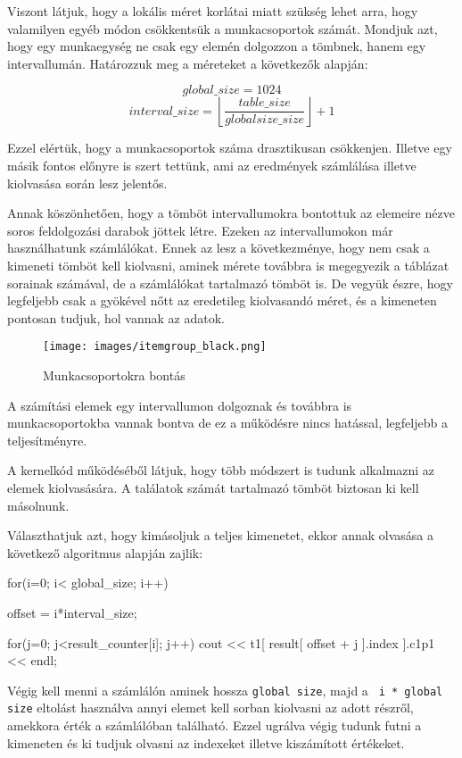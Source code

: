 Viszont látjuk, hogy a lokális méret korlátai miatt szükség lehet arra, hogy valamilyen egyéb módon csökkentsük a munkacsoportok számát.
Mondjuk azt, hogy egy munkaegység ne csak egy elemén dolgozzon a tömbnek, hanem egy intervallumán.
Határozzuk meg a méreteket a következők alapján:

$$ global\_size = 1024 $$
$$interval\_size =  \left\lfloor \frac{table\_size }{globalsize\_size} \right\rfloor  +1  $$

Ezzel elértük, hogy a munkacsoportok száma drasztikusan csökkenjen. Illetve egy másik fontos előnyre is szert tettünk, ami az eredmények számlálása illetve kiolvasása során lesz jelentős.


Annak köszönhetően, hogy a tömböt intervallumokra bontottuk az elemeire nézve soros feldolgozási darabok jöttek létre. Ezeken az intervallumokon már 
használhatunk számlálókat. Ennek az lesz a következménye, hogy nem csak a kimeneti tömböt kell kiolvasni, aminek mérete továbbra is megegyezik a táblázat sorainak számával, de a számlálókat tartalmazó tömböt is.
De vegyük észre, hogy legfeljebb csak a gyökével nőtt az eredetileg kiolvasandó méret, és a kimeneten pontosan tudjuk, hol vannak az adatok.

\begin{figure}[h!]
\centering
\texttt{[image: images/itemgroup\_black.png]}
\caption{Munkacsoportokra bontás}
\label{fig:opencl}
\end{figure}

A számítási elemek egy intervallumon dolgoznak és továbbra is munkacsoportokba vannak bontva de ez a működésre nincs hatással, legfeljebb a teljesítményre.

A kernelkód működéséből látjuk, hogy több módszert is tudunk alkalmazni az elemek kiolvasására. A találatok számát tartalmazó tömböt biztosan ki kell másolnunk.

Választhatjuk azt, hogy kimásoljuk a teljes kimenetet, ekkor annak olvasása a következő algoritmus alapján zajlik:
\begin{python}
for(i=0; i< global_size; i++)
{
  offset = i*interval_size;
  
  for(j=0; j<result_counter[i]; j++)
  cout << t1[ result[ offset + j ].index ].c1p1 << endl;
}
\end{python}
Végig kell menni a számlálón aminek hossza \texttt{global size}, majd a \texttt{ i * global size} eltolást használva annyi elemet kell sorban kiolvasni az adott részről, amekkora érték a számlálóban található. Ezzel ugrálva végig tudunk futni a kimeneten és ki tudjuk olvasni az indexeket illetve kiszámított értékeket.

